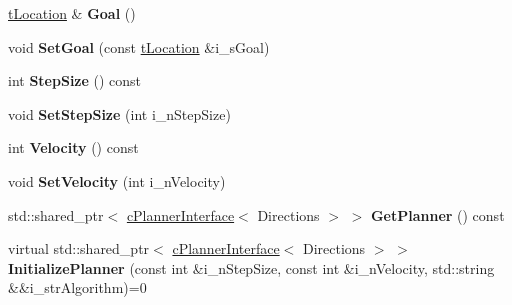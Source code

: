 \begin{DoxyCompactItemize}
\mbox{\label{classplanner_1_1c_rover_interface_a5a02ffb5e04d128bf81567da55807850}} 
\mbox{\hyperlink{structplanner_1_1t_location}{t\+Location}} \& {\bfseries Goal} ()
\item 
\mbox{\label{classplanner_1_1c_rover_interface_a8f0e30cf351e8cb7ba75622273056343}} 
void {\bfseries Set\+Goal} (const \mbox{\hyperlink{structplanner_1_1t_location}{t\+Location}} \&i\+\_\+s\+Goal)
\item 
\mbox{\label{classplanner_1_1c_rover_interface_a2a10c0d42c89adefa46390fe351583a2}} 
int {\bfseries Step\+Size} () const
\item 
\mbox{\label{classplanner_1_1c_rover_interface_ac6410b636f0f2d5614e3463912f9646f}} 
void {\bfseries Set\+Step\+Size} (int i\+\_\+n\+Step\+Size)
\item 
\mbox{\label{classplanner_1_1c_rover_interface_a65279be04ab88f54d69204087503448b}} 
int {\bfseries Velocity} () const
\item 
\mbox{\label{classplanner_1_1c_rover_interface_a209a069d48223e427e27e4582037b158}} 
void {\bfseries Set\+Velocity} (int i\+\_\+n\+Velocity)
\item 
\mbox{\label{classplanner_1_1c_rover_interface_aeab2cd88b65b86f42cfbb5b063d3f9d1}} 
std\+::shared\+\_\+ptr$<$ \mbox{\hyperlink{classplanner_1_1c_planner_interface}{c\+Planner\+Interface}}$<$ Directions $>$ $>$ {\bfseries Get\+Planner} () const
\item 
\mbox{\label{classplanner_1_1c_rover_interface_a7fedea18832ad850de1a2589fdca88b7}} 
virtual std\+::shared\+\_\+ptr$<$ \mbox{\hyperlink{classplanner_1_1c_planner_interface}{c\+Planner\+Interface}}$<$ Directions $>$ $>$ {\bfseries Initialize\+Planner} (const int \&i\+\_\+n\+Step\+Size, const int \&i\+\_\+n\+Velocity, std\+::string \&\&i\+\_\+str\+Algorithm)=0
\item 
\mbox{\label{classplanner_1_1c_rover_interface_ad2b552aaf43f7ce5af340d05b5657267}} 

\end{DoxyCompactItemize}
